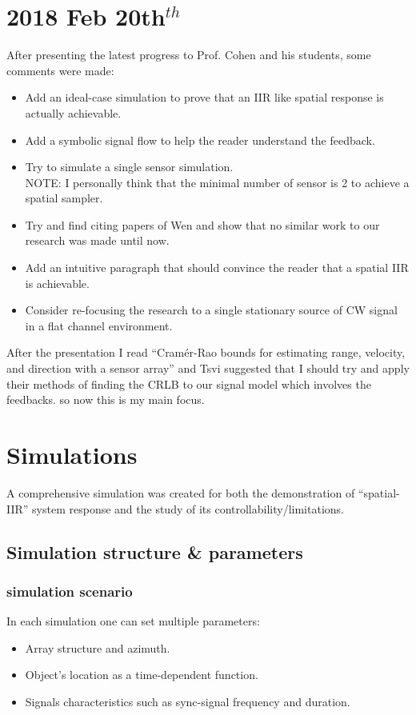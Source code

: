 \documentclass[12pt]{article}
\begin{document}
\section{2018 Feb 20th$^{th}$}
After presenting the latest progress to Prof. Cohen and his students, some comments were made:
\begin{itemize}
\item{
Add an ideal-case simulation to prove that an IIR like spatial response is actually achievable.
}
\item{
Add a symbolic signal flow to help the reader understand the feedback.
}
\item{
Try to simulate a single sensor simulation.
\\
NOTE: I personally think that the minimal number of sensor is 2 to achieve a spatial sampler.
}
\item{
Try and find citing papers of Wen and show that no similar work to our research was made until now.
}
\item{
Add an intuitive paragraph that should convince the reader that a spatial IIR is achievable.
}
\item{
Consider re-focusing the research to a single stationary source of CW signal in a flat channel environment.
}
\end{itemize}
After the presentation I read ``Cram{\'{e}}r-Rao bounds for estimating range, velocity, and direction with a sensor array'' \cite{Dogandzic2000Cramer-RaoArray} and Tsvi suggested that I should try and apply their methods of finding the CRLB to our signal model which involves the feedbacks. so now this is my main focus.

\section{Simulations}
A comprehensive simulation was created for both the demonstration of ``spatial-IIR'' system response and the study of its controllability/limitations.
\subsection{Simulation structure \& parameters}
\subsubsection{simulation scenario}
In each simulation one can set multiple parameters:
\begin{itemize}
\item{
Array structure and azimuth.
}
\item{
Object's location as a time-dependent function.
}
\item{
Signals characteristics such as sync-signal frequency and duration.
}
\end{itemize}
\end{document}
